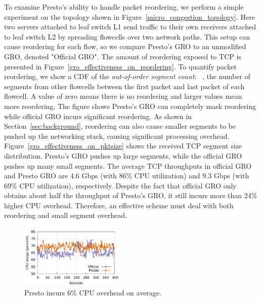 To examine Presto's ability to handle packet reordering, we perform a simple experiment
on the topology shown in Figure~\ref{micro_congestion_topology}.
Here two servers attached to leaf switch L1 
send traffic to their own receivers attached to leaf switch L2
by spreading flowcells over two network paths. 
This setup can cause reordering for each flow, so 
we compare Presto's GRO to
an unmodified GRO, denoted "Official GRO". 
The amount of reordering exposed to TCP is presented in Figure~\ref{gro_effectiveness_on_reordering}.
To quantify packet reordering, we show a CDF of the {\em out-of-order segment count}: ~\ie{},
the number of segments from other flowcells between the first packet and last packet of each flowcell. A value of zero
means there is no reordering and larger values mean more reordering. The figure shows Presto's GRO can completely mask reordering
while official GRO incurs significant reordering. As shown in Section~\ref{sec:background}, reordering can
also cause smaller segments to be pushed up the networking stack, causing significant processing overhead.
Figure~\ref{gro_effectiveness_on_pktsize} shows the received TCP segment size distribution.  Presto's GRO
pushes up large segments, while the official GRO pushes up many small segments.
The average TCP throughputs in official GRO and Presto GRO are 4.6 Gbps (with 86\% CPU utilization) and 
9.3 Gbps (with 69\% CPU utilization), respectively. Despite the fact that official GRO only obtains 
about half the throughput of Presto's GRO, it still incurs more than 24\% higher CPU overhead. 
Therefore, an effective scheme must deal with both reordering and small segment overhead.

\begin{figure}[t]
        \centering
  \includegraphics[width=0.45\textwidth]{presto/figures/mornitor_cpu/macro_compare_cpu_usage.pdf}
        \caption{Presto incurs 6\% CPU overhead on average.}
        \label{micro_compare_cpu}
\end{figure}

